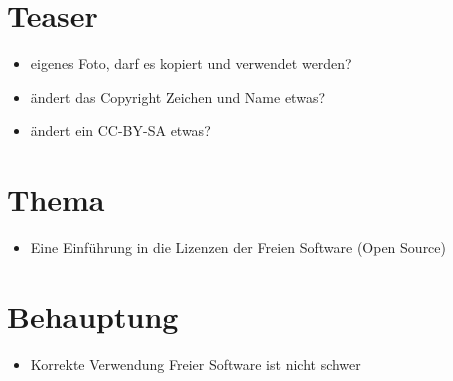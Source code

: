 \section{Teaser}
\begin{frame}
	\begin{itemize}
		\item eigenes Foto, darf es kopiert und verwendet werden?
		\item ändert das Copyright Zeichen und Name etwas?
		\item ändert ein CC-BY-SA etwas?
	\end{itemize}
\end{frame}

\section{Thema}
\note
{
	\begin{itemize}
		\item Eine Einführung in die Lizenzen der Freien Software (Open Source)
	\end{itemize}
}

\section{Behauptung}
\note
{
	\begin{itemize}
		\item Korrekte Verwendung Freier Software ist nicht schwer
	\end{itemize}
}
